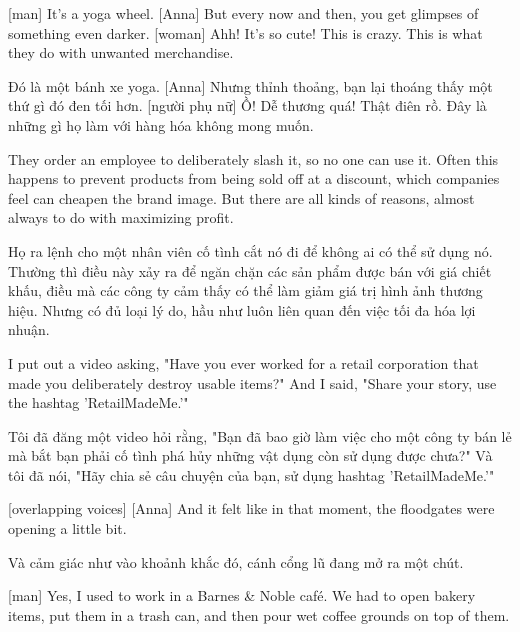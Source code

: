 \documentclass[a4paper]{article}
\begin{document}
	[man] It's a yoga wheel.
	[Anna] But every now and then, you get glimpses of something even darker.
	[woman] Ahh! It's so cute!
	This is crazy. This is what they do with unwanted merchandise.
	
	\begin{vietnamese-v2}
		 Đó là một bánh xe yoga.
		[Anna] Nhưng thỉnh thoảng, bạn lại thoáng thấy một thứ gì đó đen tối hơn.
		[người phụ nữ] Ồ! Dễ thương quá!
		Thật điên rồ. Đây là những gì họ làm với hàng hóa không mong muốn.
	\end{vietnamese-v2}
	
	They order an employee to deliberately slash it, so no one can use it.
	Often this happens to prevent products from being sold off at a discount, which companies feel can cheapen the brand image.
	But there are all kinds of reasons, almost always to do with maximizing profit.
	
	\begin{vietnamese-v2}
		Họ ra lệnh cho một nhân viên cố tình cắt nó đi để không ai có thể sử dụng nó.
		Thường thì điều này xảy ra để ngăn chặn các sản phẩm được bán với giá chiết khấu, điều mà các công ty cảm thấy có thể làm giảm giá trị hình ảnh thương hiệu.
		Nhưng có đủ loại lý do, hầu như luôn liên quan đến việc tối đa hóa lợi nhuận.
	\end{vietnamese-v2}
	
	I put out a video asking, "Have you ever worked for a retail corporation that made you deliberately destroy usable items?"
	And I said, "Share your story, use the hashtag 'RetailMadeMe.'"
	
	\begin{vietnamese-v2}
		Tôi đã đăng một video hỏi rằng, "Bạn đã bao giờ làm việc cho một công ty bán lẻ mà bắt bạn phải cố tình phá hủy những vật dụng còn sử dụng được chưa?"
		Và tôi đã nói, "Hãy chia sẻ câu chuyện của bạn, sử dụng hashtag 'RetailMadeMe.'"
	\end{vietnamese-v2}
	
	[overlapping voices]
	[Anna] And it felt like in that moment, the floodgates were opening a little bit.
	
	\begin{vietnamese-v2}
		 Và cảm giác như vào khoảnh khắc đó, cánh cổng lũ đang mở ra một chút.
	\end{vietnamese-v2}
	
	[man] Yes, I used to work in a Barnes \& Noble café.
	We had to open bakery items, put them in a trash can, and then pour wet coffee grounds on top of them.
	
\end{document}

